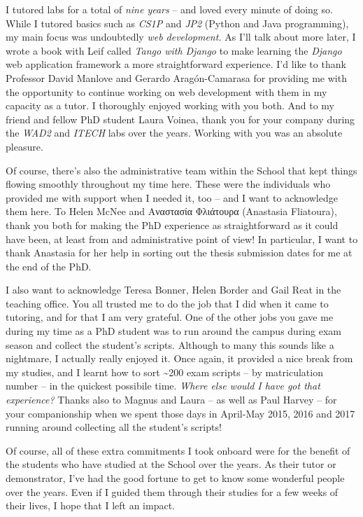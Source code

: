 \begin{preamble}
I tutored labs for a total of \emph{nine years} -- and loved every minute of doing so. While I tutored basics such as \emph{CS1P} and \emph{JP2} (Python and Java programming), my main focus was undoubtedly \emph{web development.} As I'll talk about more later, I wrote a book with Leif called \emph{Tango with Django} to make learning the \emph{Django} web application framework a more straightforward experience. I'd like to thank Professor David Manlove and Gerardo Arag\'{o}n-Camarasa for providing me with the opportunity to continue working on web development with them in my capacity as a tutor. I thoroughly enjoyed working with you both. And to my friend and fellow PhD student Laura Voinea, thank you for your company during the \emph{WAD2} and \emph{ITECH} labs over the years. Working with you was an absolute pleasure.

Of course, there's also the administrative team within the School that kept things flowing smoothly throughout my time here. These were the individuals who provided me with support when I needed it, too -- and I want to acknowledge them here. To Helen McNee and Αναστασία Φλιάτουρα (Anastasia Fliatoura), thank you both for making the PhD experience as straightforward as it could have been, at least from and administrative point of view! In particular, I want to thank Anastasia for her help in sorting out the thesis submission dates for me at the end of the PhD.

I also want to acknowledge Teresa Bonner, Helen Border and Gail Reat in the teaching office. You all trusted me to do the job that I did when it came to tutoring, and for that I am very grateful. One of the other jobs you gave me during my time as a PhD student was to run around the campus during exam season and collect the student's scripts. Although to many this sounds like a nightmare, I actually really enjoyed it. Once again, it provided a nice break from my studies, and I learnt how to sort \textasciitilde 200 exam scripts -- by matriculation number -- in the quickest possibile time. \emph{Where else would I have got that experience?} Thanks also to Magnus and Laura -- as well as Paul Harvey -- for your companionship when we spent those days in April-May 2015, 2016 and 2017 running around collecting all the student's scripts!

Of course, all of these extra commitments I took onboard were for the benefit of the students who have studied at the School over the years. As their tutor or demonstrator, I've had the good fortune to get to know some wonderful people over the years. Even if I guided them through their studies for a few weeks of their lives, I hope that I left an impact.


\end{preamble}
